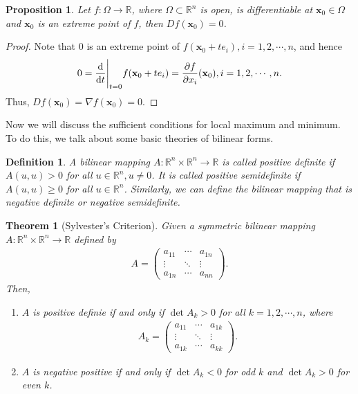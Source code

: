\documentclass[11pt]{book}
\newtheorem{definition}{Definition}[chapter]
\newtheorem{theorem}{Theorem}[chapter]
\newtheorem{proposition}{Proposition}[chapter]
\theoremstyle{definition}
\numberwithin{equation}{chapter}
\begin{document}
\medskip

\begin{proposition}\label{prop_76}
Let $f: \Omega \to \mathbb{R}$, where $\Omega \subset \mathbb{R}^n$ is open, is differentiable at $\mathbf{x}_0 \in \Omega$ and $\mathbf{x}_0$ is an extreme point of $f$, then $Df(\mathbf{x}_0) = 0$.
\end{proposition}
\begin{proof}
Note that $0$ is an extreme point of $f(\mathbf{x}_0 + t e_i), i = 1,2,\cdots, n$, and hence
\begin{align*}
    0 = \dv{}{t}\Bigg|_{t=0} f(\mathbf{x}_0 + t e_i) = \frac{\partial f}{\partial x_i}(\mathbf{x}_0), i = 1,2,\cdots, n.
\end{align*}
Thus, $Df(\mathbf{x}_0) = \nabla f(\mathbf{x}_0) = 0$.
\end{proof}

\medskip

Now we will discuss the sufficient conditions for local maximum and minimum. To do this, we talk about some basic theories of bilinear forms.

\medskip

\begin{definition}
A bilinear mapping $A: \mathbb{R}^n \times \mathbb{R}^n \to \mathbb{R}$ is called positive definite if $A(u,u) > 0$ for all $u \in \mathbb{R}^n, u \neq 0$.  It is called positive semidefinite if $A(u,u) \geq 0$ for all $u \in \mathbb{R}^n$. Similarly, we can define the bilinear mapping that is negative definite or negative semidefinite.
\end{definition}

\medskip

\begin{theorem}[Sylvester's Criterion]
Given a symmetric bilinear mapping $A: \mathbb{R}^n \times \mathbb{R}^n \to \mathbb{R}$ defined by
\begin{align*}
    A = \begin{pmatrix}
        a_{11} & \cdots & a_{1n} \\
        \vdots & \ddots & \vdots \\
        a_{1n} & \cdots & a_{nn}
    \end{pmatrix}.
\end{align*}
Then,
\begin{enumerate}[label=(\alph*)]
    \item $A$ is positive definie if and only if $\det A_k > 0$ for all $k = 1,2,\cdots,n$, where
    \begin{align*}
        A_k = \begin{pmatrix}
        a_{11} & \cdots & a_{1k} \\
        \vdots & \ddots & \vdots \\
        a_{1k} & \cdots & a_{kk}
    \end{pmatrix}.
    \end{align*}
    
    \item $A$ is negative positive if and only if $\det A_k < 0$ for odd $k$ and $\det A_k > 0$ for even $k$.
\end{enumerate}
\end{theorem}
\end{document}
